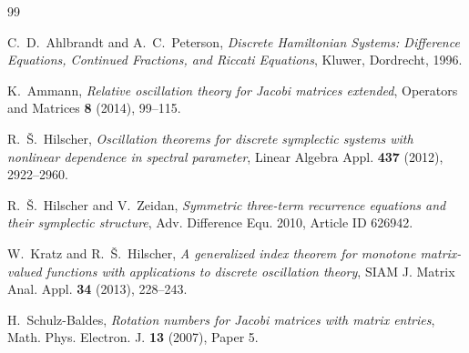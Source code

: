\documentclass[11pt]{article}
\numberwithin{equation}{section}
\begin{document}
\begin{thebibliography}{99}

C.~D.~Ahlbrandt and A.~C.~Peterson,
\emph{Discrete Hamiltonian Systems: Difference Equations, Continued Fractions, and Riccati Equations},
Kluwer, Dordrecht, 1996.

K.~Ammann,
\emph{Relative oscillation theory for Jacobi matrices extended},
Operators and Matrices \textbf{8} (2014), 99--115.

R.~\v{S}.~Hilscher,
\emph{Oscillation theorems for discrete symplectic systems with nonlinear dependence in spectral parameter},
Linear Algebra Appl. \textbf{437} (2012), 2922--2960.

R.~\v{S}.~Hilscher and V.~Zeidan,
\emph{Symmetric three-term recurrence equations and their symplectic structure},
Adv. Difference Equ. 2010, Article ID 626942.

W.~Kratz and R.~\v{S}.~Hilscher,
\emph{A generalized index theorem for monotone matrix-valued functions with applications to discrete oscillation theory},
SIAM J. Matrix Anal. Appl. \textbf{34} (2013), 228--243.

H.~Schulz-Baldes,
\emph{Rotation numbers for Jacobi matrices with matrix entries},
Math. Phys. Electron. J. \textbf{13} (2007), Paper 5.

\end{thebibliography}
\end{document}
